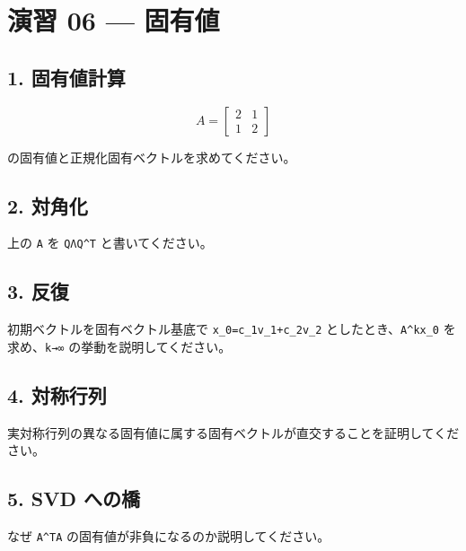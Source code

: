 \documentclass[
  11pt,
  a4paper,
]{ltjsarticle}
\author{}
\date{}
\begin{document}
\hypertarget{ux6f14ux7fd2-06-ux56faux6709ux5024}{%
\section{演習 06 --- 固有値}\label{ux6f14ux7fd2-06-ux56faux6709ux5024}}

\hypertarget{ux56faux6709ux5024ux8a08ux7b97}{%
\subsection{1. 固有値計算}\label{ux56faux6709ux5024ux8a08ux7b97}}

\[
A=\begin{bmatrix}2&1\\1&2\end{bmatrix}
\]

の固有値と正規化固有ベクトルを求めてください。

\hypertarget{ux5bfeux89d2ux5316}{%
\subsection{2. 対角化}\label{ux5bfeux89d2ux5316}}

上の \texttt{A} を \texttt{QΛQ\^{}T} と書いてください。

\hypertarget{ux53cdux5fa9}{%
\subsection{3. 反復}\label{ux53cdux5fa9}}

初期ベクトルを固有ベクトル基底で \texttt{x\_0=c\_1v\_1+c\_2v\_2}
としたとき、\texttt{A\^{}kx\_0} を求め、\texttt{k→∞}
の挙動を説明してください。

\hypertarget{ux5bfeux79f0ux884cux5217}{%
\subsection{4. 対称行列}\label{ux5bfeux79f0ux884cux5217}}

実対称行列の異なる固有値に属する固有ベクトルが直交することを証明してください。

\hypertarget{svd-ux3078ux306eux6a4b}{%
\subsection{5. SVD への橋}\label{svd-ux3078ux306eux6a4b}}

なぜ \texttt{A\^{}TA} の固有値が非負になるのか説明してください。
\end{document}
